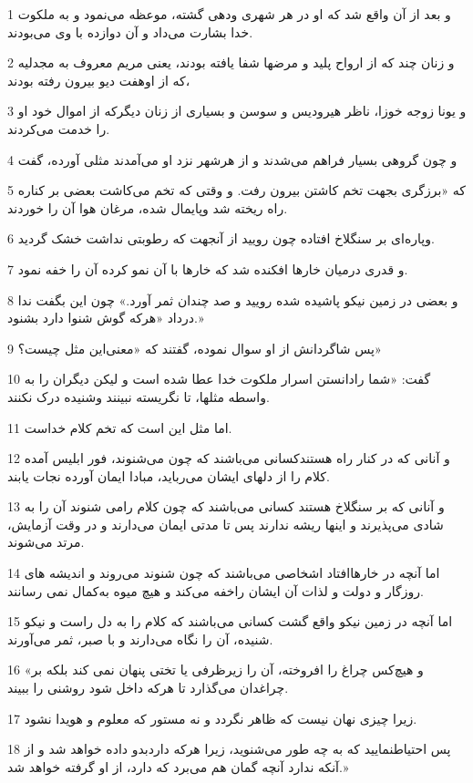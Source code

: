 \par 1 و بعد از آن واقع شد که او در هر شهری ودهی گشته، موعظه می‌نمود و به ملکوت خدا بشارت می‌داد و آن دوازده با وی می‌بودند.
\par 2 و زنان چند که از ارواح پلید و مرضها شفا یافته بودند، یعنی مریم معروف به مجدلیه که از اوهفت دیو بیرون رفته بودند،
\par 3 و یونا زوجه خوزا، ناظر هیرودیس و سوسن و بسیاری از زنان دیگرکه از اموال خود او را خدمت می‌کردند.
\par 4 و چون گروهی بسیار فراهم می‌شدند و از هرشهر نزد او می‌آمدند مثلی آورده، گفت
\par 5 که «برزگری بجهت تخم کاشتن بیرون رفت. و وقتی که تخم می‌کاشت بعضی بر کناره راه ریخته شد وپایمال شده، مرغان هوا آن را خوردند.
\par 6 وپاره‌ای بر سنگلاخ افتاده چون رویید از آنجهت که رطوبتی نداشت خشک گردید.
\par 7 و قدری درمیان خارها افکنده شد که خارها با آن نمو کرده آن را خفه نمود.
\par 8 و بعضی در زمین نیکو پاشیده شده رویید و صد چندان ثمر آورد.» چون این بگفت ندا در‌داد «هر‌که گوش شنوا دارد بشنود.»
\par 9 پس شاگردانش از او سوال نموده، گفتند که «معنی‌این مثل چیست؟»
\par 10 گفت: «شما رادانستن اسرار ملکوت خدا عطا شده است و لیکن دیگران را به واسطه مثلها، تا نگریسته نبینند وشنیده درک نکنند.
\par 11 اما مثل این است که تخم کلام خداست.
\par 12 و آنانی که در کنار راه هستندکسانی می‌باشند که چون می‌شنوند، فور ابلیس آمده کلام را از دلهای ایشان می‌رباید، مبادا ایمان آورده نجات یابند.
\par 13 و آنانی که بر سنگلاخ هستند کسانی می‌باشند که چون کلام رامی شنوند آن را به شادی می‌پذیرند و اینها ریشه ندارند پس تا مدتی ایمان می‌دارند و در وقت آزمایش، مرتد می‌شوند.
\par 14 اما آنچه در خارهاافتاد اشخاصی می‌باشند که چون شنوند می‌روند و اندیشه های روزگار و دولت و لذات آن ایشان راخفه می‌کند و هیچ میوه به‌کمال نمی رسانند.
\par 15 اما آنچه در زمین نیکو واقع گشت کسانی می‌باشند که کلام را به دل راست و نیکو شنیده، آن را نگاه می‌دارند و با صبر، ثمر می‌آورند.
\par 16 «و هیچ‌کس چراغ را افروخته، آن را زیرظرفی یا تختی پنهان نمی کند بلکه بر چراغدان می‌گذارد تا هر‌که داخل شود روشنی را ببیند.
\par 17 زیرا چیزی نهان نیست که ظاهر نگردد و نه مستور که معلوم و هویدا نشود.
\par 18 پس احتیاطنمایید که به چه طور می‌شنوید، زیرا هر‌که داردبدو داده خواهد شد و از آنکه ندارد آنچه گمان هم می‌برد که دارد، از او گرفته خواهد شد.»
